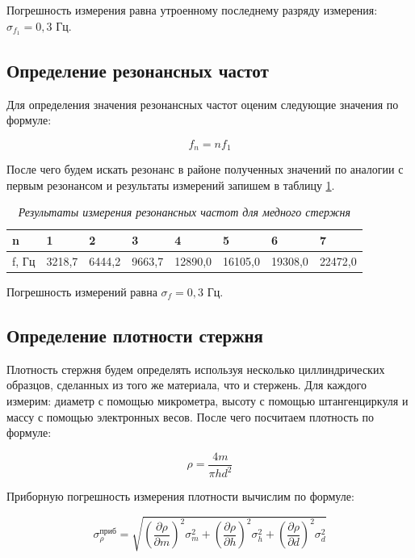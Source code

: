 \documentclass[a4paper,12pt]{article}
\begin{document}
Погрешность измерения равна утроенному последнему разряду измерения: $\sigma_{f_1} = 0,3 \text{ Гц}$.

\subsection{Определение резонансных частот}

Для определения значения резонансных частот оценим следующие значения по формуле:

\begin{equation}
    f_n = n f_1
\end{equation}

После чего будем искать резонанс в районе полученных значений по аналогии с первым резонансом и результаты измерений запишем в таблицу \ref{cu-resonance}.

\begin{table}[!ht]
    \centering
    \begin{tabular}{|l|l|l|l|l|l|l|l|}
    \hline
        n & 1 & 2 & 3 & 4 & 5 & 6 & 7 \\ \hline
        f, Гц & 3218,7 & 6444,2 & 9663,7 & 12890,0 & 16105,0 & 19308,0 & 22472,0 \\ \hline
    \end{tabular}\caption{\textit{Результаты измерения резонансных частот для медного стержня}}\label{cu-resonance}
\end{table}

Погрешность измерений равна $\sigma_f = 0,3$ Гц.

\subsection{Определение плотности стержня}

Плотность стержня будем определять используя несколько циллиндрических образцов, сделанных из того же материала, что и стержень. Для каждого измерим: диаметр с помощью микрометра, высоту с помощью штангенциркуля и массу с помощью электронных весов. После чего посчитаем плотность по формуле:

\begin{equation}
    \rho = \frac{4 m}{\pi h d^2}
\end{equation}

Приборную погрешность измерения плотности вычислим по формуле:

\begin{equation}
    \sigma_\rho^\text{приб} = \sqrt{
    \left ( \frac{\partial \rho}{\partial m} \right )^2 \sigma_{m} ^ 2 + 
    \left ( \frac{\partial \rho}{\partial h} \right )^2 \sigma_{h} ^ 2 + 
    \left ( \frac{\partial \rho}{\partial d} \right )^2 \sigma_{d} ^ 2
    }
\end{equation}
\end{document}
